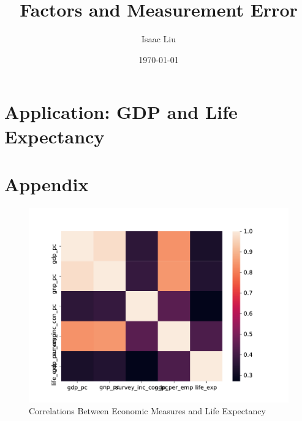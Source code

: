 \documentclass{report}
\title{Factors and Measurement Error}
\author{Isaac Liu}
\date{\today}
\begin{document}
	\maketitle

	\newpage \clearpage

    \section*{Application: GDP and Life Expectancy}

    

    \clearpage \newpage

    \appendix

    \section*{Appendix}

	\begin{figure}[h!]
		\centering
		\caption{Correlations Between Economic Measures and Life Expectancy}
		\label{GDP_LE_Correlations_Correlations}	
		\includegraphics[width=\linewidth,keepaspectratio=true]{../Output/Figures/GDP_LE_Correlations.pdf}
	\end{figure}
\end{document}
